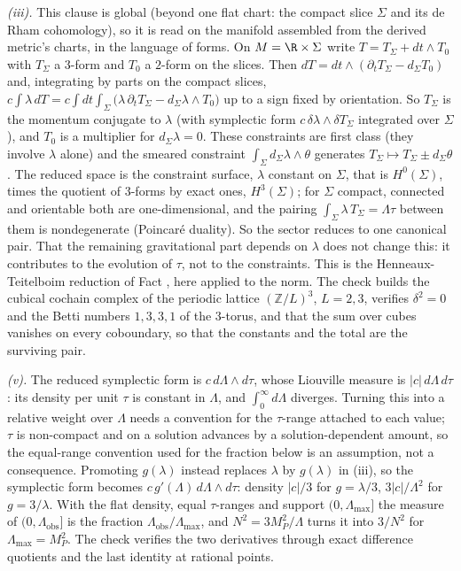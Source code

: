 \emph{(iii).} This clause is global (beyond one flat chart: the compact slice $\Sigma$ and its de Rham cohomology), so it is read on the manifold assembled from the derived metric's charts, in the language of forms. On $M = \R \times \Sigma$ write $T = T_{\Sigma} + dt \wedge T_{0}$ with $T_{\Sigma}$ a $3$-form and $T_{0}$ a $2$-form on the slices. Then $dT = dt \wedge (\partial_{t}T_{\Sigma} - d_{\Sigma}T_{0})$ and, integrating by parts on the compact slices, $c\int\lambda\,dT = c\int dt\int_{\Sigma}\bigl(\lambda\,\partial_{t}T_{\Sigma} - d_{\Sigma}\lambda \wedge T_{0}\bigr)$ up to a sign fixed by orientation. So $T_{\Sigma}$ is the momentum conjugate to $\lambda$ (with symplectic form $c\,\delta\lambda \wedge \delta T_{\Sigma}$ integrated over $\Sigma$), and $T_{0}$ is a multiplier for $d_{\Sigma}\lambda = 0$. These constraints are first class (they involve $\lambda$ alone) and the smeared constraint $\int_{\Sigma}d_{\Sigma}\lambda \wedge \theta$ generates $T_{\Sigma} \mapsto T_{\Sigma} \pm d_{\Sigma}\theta$. The reduced space is the constraint surface, $\lambda$ constant on $\Sigma$, that is $H^{0}(\Sigma)$, times the quotient of $3$-forms by exact ones, $H^{3}(\Sigma)$; for $\Sigma$ compact, connected and orientable both are one-dimensional, and the pairing $\int_{\Sigma}\lambda\,T_{\Sigma} = \Lambda\tau$ between them is nondegenerate (Poincar\'e duality). So the sector reduces to one canonical pair. That the remaining gravitational part depends on $\lambda$ does not change this: it contributes to the evolution of $\tau$, not to the constraints. This is the Henneaux-Teitelboim reduction of Fact , here applied to the norm. The check builds the cubical cochain complex of the periodic lattice $(\mathbb{Z}/L)^{3}$, $L = 2, 3$, verifies $\delta^{2} = 0$ and the Betti numbers $1, 3, 3, 1$ of the $3$-torus, and that the sum over cubes vanishes on every coboundary, so that the constants and the total are the surviving pair.

\emph{(v).} The reduced symplectic form is $c\,d\Lambda \wedge d\tau$, whose Liouville measure is $|c|\,d\Lambda\,d\tau$: its density per unit $\tau$ is constant in $\Lambda$, and $\int_{0}^{\infty}d\Lambda$ diverges. Turning this into a relative weight over $\Lambda$ needs a convention for the $\tau$-range attached to each value; $\tau$ is non-compact and on a solution advances by a solution-dependent amount, so the equal-range convention used for the fraction below is an assumption, not a consequence. Promoting $g(\lambda)$ instead replaces $\lambda$ by $g(\lambda)$ in (iii), so the symplectic form becomes $c\,g'(\Lambda)\,d\Lambda \wedge d\tau$: density $|c|/3$ for $g = \lambda/3$, $3|c|/\Lambda^{2}$ for $g = 3/\lambda$. With the flat density, equal $\tau$-ranges and support $(0, \Lambda_{\max}]$ the measure of $(0, \Lambda_{\mathrm{obs}}]$ is the fraction $\Lambda_{\mathrm{obs}}/\Lambda_{\max}$, and $N^{2} = 3M_{P}^{2}/\Lambda$ turns it into $3/N^{2}$ for $\Lambda_{\max} = M_{P}^{2}$. The check verifies the two derivatives through exact difference quotients and the last identity at rational points.

